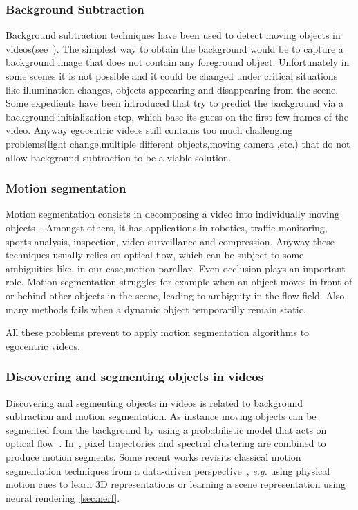 \subsubsection{Background Subtraction}
Background subtraction techniques have been used to detect moving objects 
in videos(see~\cite{ndiff_2}). The simplest way to obtain the background would be to capture
a background image that does not contain any foreground object. Unfortunately in some scenes
it is not possible and it could be changed under critical situations like illumination
changes, objects appeearing and disappearing from the scene. Some expedients have been
introduced that try to predict the background via a background initialization step, which base
its guess on the first few frames of the video. Anyway egocentric videos still contains too much
challenging problems(light change,multiple different objects,moving camera ,etc.) that do not allow background subtraction to be a viable solution.

\subsubsection{Motion segmentation}
Motion segmentation consists in decomposing a video into individually moving 
objects~\cite{ndiff_18}. Amongst others, it has applications in 
robotics, traffic monitoring, sports analysis, inspection, video surveillance and compression.
Anyway these techniques usually relies on optical flow, which can be subject to some ambiguities
like, in our case,motion parallax. Even occlusion plays an important role. Motion segmentation
struggles for example when an object moves in front of or behind other objects in the 
scene, leading to ambiguity in the flow field. Also, many methods fails when a dynamic 
object temporarilly remain static.

All these problems prevent to apply motion segmentation algorithms to egocentric videos.

\subsubsection{Discovering and segmenting objects in videos}
Discovering and segmenting objects in videos is related to background subtraction and 
motion segmentation.
As instance moving objects can be segmented from the background by using a probabilistic model
that acts on optical flow~\cite{ndiff_1}. In~\cite{ndiff_3}, pixel trajectories and
spectral clustering are combined to produce motion segments. Some recent works revisits classical motion segmentation
techniques from a data-driven perspective~\cite{ndiff_38}, \textit{e.g.} using 
physical motion cues to learn 3D representations or learning a scene representation
using neural rendering~\ref{sec:nerf}. 

